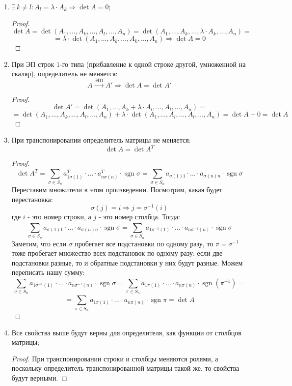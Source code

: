 \documentclass[12pt]{article}
\theoremstyle{definition}
\DeclareMathOperator{\sgn}{sgn}
\newcommand{\ddsum}[2]{\displaystyle\sum\limits_{#1}^{#2}}
\begin{document}
\begin{enumerate}[label=\arabic*)]
\begin{proof}
$$		$$
		$$
			= - \det{(A_1,\dotsc, A_k,\dotsc,A_l, \dotsc,A_n)} = -\det{A} \Rightarrow \det{A} = 0
		$$
	\end{proof}
	\item $\exists \, k \neq l \colon A_l = \lambda{\cdot}A_k \Rightarrow \det{A} = 0$;
	\begin{proof}
		$$
			\det{A} = \det{(A_1,\dotsc, A_k,\dotsc,A_l, \dotsc,A_n)} = \det{(A_1,\dotsc, A_k,\dotsc,\lambda{\cdot}A_k, \dotsc,A_n)} =
		$$
		$$
			= \lambda{\cdot}\det{(A_1,\dotsc, A_k,\dotsc,A_k, \dotsc,A_n)} \Rightarrow \det{A} = 0
		$$
	\end{proof}
	\item При ЭП строк $1$-го типа (прибавление к одной строке другой, умноженной на скаляр), определитель не меняется:
	$$
		A \xrightarrow{\text{ЭП}1} A' \Rightarrow \det{A} = \det{A'}
	$$
	\begin{proof}
		$$
			\det{A'} = \det{(A_1,\dotsc, A_k + \lambda{\cdot}A_l,\dotsc,A_l, \dotsc,A_n)} = 
		$$
		$$
			=	\det{(A_1,\dotsc, A_k ,\dotsc,A_l, \dotsc,A_n)} + \lambda{\cdot}\det{(A_1,\dotsc, A_l ,\dotsc,A_l, \dotsc,A_n)} = \det{A} + 0= \det{A}
		$$
	\end{proof}
	\item При транспонировании определитель матрицы не меняется:
	$$
		\det{A} = \det{A^T}
	$$
	\begin{proof}
		$$
			\det{A^T} = \ddsum{\sigma \in S_n}{}a^T_{1\sigma(1)}{\cdot}\dotsc{\cdot}a^T _{n\sigma(n)}{\cdot}\sgn{\sigma} = \ddsum{\sigma \in S_n}{}a_{\sigma(1)1}{\cdot}\dotsc{\cdot}a _{\sigma(n)n}{\cdot}\sgn{\sigma}
		$$
		Переставим множители в этом произведении. Посмотрим, какая будет перестановка:
		$$
			\sigma(j) = i \Rightarrow j = \sigma^{-1}(i )
		$$
		где $i$ - это номер строки, а $j$ - это номер столбца. Тогда:
		$$
			\ddsum{\sigma \in S_n}{}a_{\sigma(1)1}{\cdot}\dotsc{\cdot}a _{\sigma(n)n}{\cdot}\sgn{\sigma} = \ddsum{\sigma \in S_n}{}a_{1\sigma^{-1}(1)}{\cdot}\dotsc{\cdot}a _{n\sigma^{-1}(n)}{\cdot}\sgn{\sigma}
		$$
		Заметим, что если $\sigma$ пробегает все подстановки по одному разу, то $\pi =\sigma^{-1}$ тоже пробегает множество всех подстановок по одному разу: если две подстановки разные, то и обратные подстановки у них будут разные. Можем переписать нашу сумму:
		$$
			\ddsum{\sigma \in S_n}{}a_{1\sigma^{-1}(1)}{\cdot}\dotsc{\cdot}a _{n\sigma^{-1}(n)}{\cdot}\sgn{\sigma} = \ddsum{\pi \in S_n}{}a_{1\pi(1)}{\cdot}\dotsc{\cdot}a _{n\pi(n)}{\cdot}\sgn{(\pi^{-1})} = 
		$$
		$$
			= \ddsum{\pi \in S_n}{}a_{1\pi(1)}{\cdot}\dotsc{\cdot}a _{n\pi(n)}{\cdot}\sgn{\pi} = \det{A}
		$$
	\end{proof}
	\item Все свойства выше будут верны для определителя, как функции от столбцов матрицы;
	\begin{proof}
		При транспонировании строки и столбцы меняются ролями, а поскольку определитель транспонированной матрицы такой же, то свойства будут верными.
	\end{proof}
\end{enumerate}
\end{document}
